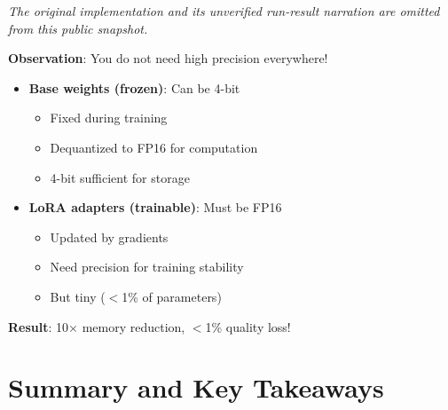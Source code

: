 \documentclass{article}
\begin{document}
\textit{The original implementation and its unverified run-result narration are
omitted from this public snapshot.}

\begin{tcolorbox}[colback=green!5!white, colframe=green!50!black, title=Why QLoRA Works: The Key Insight]
\textbf{Observation}: You do not need high precision everywhere!

\begin{itemize}
\item \textbf{Base weights (frozen)}: Can be 4-bit
\begin{itemize}
\item Fixed during training
\item Dequantized to FP16 for computation
\item 4-bit sufficient for storage
\end{itemize}

\item \textbf{LoRA adapters (trainable)}: Must be FP16
\begin{itemize}
\item Updated by gradients
\item Need precision for training stability
\item But tiny ($<$1\% of parameters)
\end{itemize}
\end{itemize}

\textbf{Result}: 10$\times$ memory reduction, $<$1\% quality loss!
\end{tcolorbox}

\section{Summary and Key Takeaways}
\end{document}
